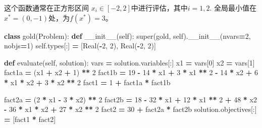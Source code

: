 \documentclass[]{ctexbook}
\newenvironment{Shaded}{\begin{snugshade}}{\end{snugshade}}
\newcommand{\KeywordTok}[1]{\textcolor[rgb]{0.13,0.29,0.53}{\textbf{#1}}}
\newcommand{\DecValTok}[1]{\textcolor[rgb]{0.00,0.00,0.81}{#1}}
\newcommand{\FunctionTok}[1]{\textcolor[rgb]{0.00,0.00,0.00}{#1}}
\newcommand{\VariableTok}[1]{\textcolor[rgb]{0.00,0.00,0.00}{#1}}
\newcommand{\OperatorTok}[1]{\textcolor[rgb]{0.81,0.36,0.00}{\textbf{#1}}}
\newcommand{\BuiltInTok}[1]{#1}
\newcommand{\NormalTok}[1]{#1}
\begin{document}
这个函数通常在正方形区间 \(x_i \in[-2,2]\)中进行评估，其中\(i = 1,2\).
全局最小值在\(x^*=(0,-1)\)处，为\(f(x^*)=3\)。

\begin{Shaded}
\begin{Highlighting}[]
\KeywordTok{class}\NormalTok{ gold(Problem):}
    \KeywordTok{def} \FunctionTok{__init__}\NormalTok{(}\VariableTok{self}\NormalTok{):}
        \BuiltInTok{super}\NormalTok{(gold, }\VariableTok{self}\NormalTok{).}\FunctionTok{__init__}\NormalTok{(nvars}\OperatorTok{=}\DecValTok{2}\NormalTok{, nobjs}\OperatorTok{=}\DecValTok{1}\NormalTok{)}
        \VariableTok{self}\NormalTok{.types[:] }\OperatorTok{=}\NormalTok{ [Real(}\OperatorTok{-}\DecValTok{2}\NormalTok{, }\DecValTok{2}\NormalTok{), Real(}\OperatorTok{-}\DecValTok{2}\NormalTok{, }\DecValTok{2}\NormalTok{)]}

    \KeywordTok{def}\NormalTok{ evaluate(}\VariableTok{self}\NormalTok{, solution):}
        \BuiltInTok{vars} \OperatorTok{=}\NormalTok{ solution.variables[:]}
\NormalTok{        x1 }\OperatorTok{=} \BuiltInTok{vars}\NormalTok{[}\DecValTok{0}\NormalTok{]}
\NormalTok{        x2 }\OperatorTok{=} \BuiltInTok{vars}\NormalTok{[}\DecValTok{1}\NormalTok{]}
\NormalTok{        fact1a }\OperatorTok{=}\NormalTok{ (x1 }\OperatorTok{+}\NormalTok{ x2 }\OperatorTok{+} \DecValTok{1}\NormalTok{) }\OperatorTok{**} \DecValTok{2}
\NormalTok{        fact1b }\OperatorTok{=} \DecValTok{19} \OperatorTok{-} \DecValTok{14} \OperatorTok{*}\NormalTok{ x1 }\OperatorTok{+} \DecValTok{3} \OperatorTok{*}\NormalTok{ x1 }\OperatorTok{**} \DecValTok{2} \OperatorTok{-} \DecValTok{14} \OperatorTok{*}\NormalTok{ x2 }\OperatorTok{+} \DecValTok{6} \OperatorTok{*}\NormalTok{ x1 }\OperatorTok{*}\NormalTok{ x2 }\OperatorTok{+} \DecValTok{3} \OperatorTok{*}\NormalTok{ x2 }\OperatorTok{**} \DecValTok{2}
\NormalTok{        fact1 }\OperatorTok{=} \DecValTok{1} \OperatorTok{+}\NormalTok{ fact1a }\OperatorTok{*}\NormalTok{ fact1b}

\NormalTok{        fact2a }\OperatorTok{=}\NormalTok{ (}\DecValTok{2} \OperatorTok{*}\NormalTok{ x1 }\OperatorTok{-} \DecValTok{3} \OperatorTok{*}\NormalTok{ x2) }\OperatorTok{**} \DecValTok{2}
\NormalTok{        fact2b }\OperatorTok{=} \DecValTok{18} \OperatorTok{-} \DecValTok{32} \OperatorTok{*}\NormalTok{ x1 }\OperatorTok{+} \DecValTok{12} \OperatorTok{*}\NormalTok{ x1 }\OperatorTok{**} \DecValTok{2} \OperatorTok{+} \DecValTok{48} \OperatorTok{*}\NormalTok{ x2 }\OperatorTok{-} \DecValTok{36} \OperatorTok{*}\NormalTok{ x1 }\OperatorTok{*}\NormalTok{ x2 }\OperatorTok{+} \DecValTok{27} \OperatorTok{*}\NormalTok{ x2 }\OperatorTok{**} \DecValTok{2}
\NormalTok{        fact2 }\OperatorTok{=} \DecValTok{30} \OperatorTok{+}\NormalTok{ fact2a }\OperatorTok{*}\NormalTok{ fact2b}
\NormalTok{        solution.objectives[:] }\OperatorTok{=}\NormalTok{ [fact1 }\OperatorTok{*}\NormalTok{ fact2]}
\end{Highlighting}
\end{Shaded}
\end{document}
